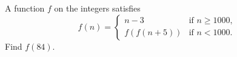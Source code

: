 A function $f$ on the integers satisfies
\[
f(n)=\begin{cases} n-3 & \text{if } n\ge1000,\\ f(f(n+5)) & \text{if } n<1000.\end{cases}
\]
Find $f(84)$.
